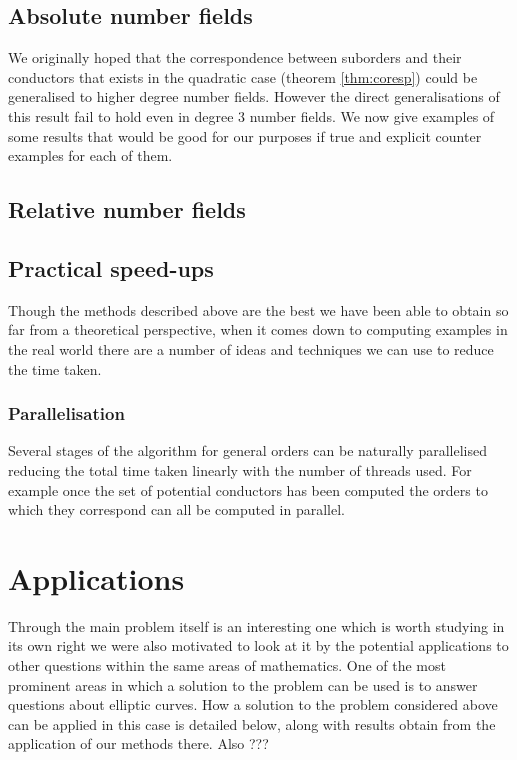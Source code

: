 \documentclass[a4paper,abstracton]{scrreprt}
\theoremstyle{definition}
\begin{document}
\section{Absolute number fields}

We originally hoped that the correspondence between suborders and their conductors that exists in the quadratic case (theorem \ref{thm:coresp}) could be generalised to higher degree number fields.
However the direct generalisations of this result fail to hold even in degree 3 number fields.
We now give examples of some results that would be good for our purposes if true and explicit counter examples for each of them.


\section{Relative number fields}


\section{Practical speed-ups}
Though the methods described above are the best we have been able to obtain so far from a theoretical perspective, when it comes down to computing examples in the real world there are a number of ideas and techniques we can use to reduce the time taken.

\subsection{Parallelisation}
Several stages of the algorithm for general orders can be naturally parallelised reducing the total time taken linearly with the number of threads used.
For example once the set of potential conductors has been computed the orders to which they correspond can all be computed in parallel.


\chapter{Applications}

Through the main problem itself is an interesting one which is worth studying in its own right we were also motivated to look at it by the potential applications to other questions within the same areas of mathematics.
One of the most prominent areas in which a solution to the problem can be used is to answer questions about elliptic curves.
How a solution to the problem considered above can be applied in this case is detailed below, along with results obtain from the application of our methods there.
Also ???
\end{document}
